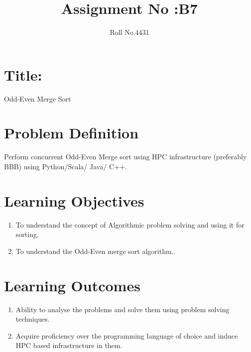 \documentclass[10pt,a4paper]{article}
\title{Assignment No :B7}
\date{}
\author{Roll No.4431}
\begin{document}
\maketitle
\section{Title:}
Odd-Even Merge Sort

\section{Problem Definition}
Perform concurrent Odd-Even Merge sort using HPC infrastructure (preferably BBB) using Python/Scala/ Java/ C++.

\section{Learning Objectives}
\begin{enumerate}
\item To understand the concept of Algorithmic problem solving and using it for sorting.
\item To understand the Odd-Even merge sort algorithm..
\end{enumerate}

\section{Learning Outcomes}
\begin{enumerate}
\item Ability to analyse the problems and solve them using problem solving techniques.
\item Acquire proficiency over the programming language of choice and induce HPC based infrastructure in them.
\end{enumerate}
\end{document}
